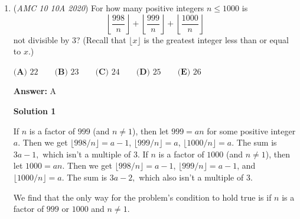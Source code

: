 \begin{enumerate}
 Therefore, the product contains exactly $8\cdot17=136$ distinct powers of $2$.

 Finally, the extra $1=2^0$ contributes one more distinct power of $2$.

 Thus, the answer is

 
 \[\boxed{8\cdot17+1=137}.\]




\textbf{Solution 9 (Intermediate Value Theorem, Cheese)}

Notice that A, C, and D are all odd integers while B and E are not. Notice that $117<137<273$. Thus, according to the intermediate value theorem of guessing, the answer is $\boxed{\textbf{(C) }137}$

 Important Note: IVT does not apply to answers which are consecutive integers because parity distinction is irrelevant (special case).

 Note following Important Note: There are a lot more cases.

 \href{https://artofproblemsolving.com/videos/amc/2020amc10a/511}{https://artofproblemsolving.com/videos/amc/2020amc10a/511}

 


	\item (\textit{AMC 10 10A 2020}) For how many positive integers $n \le 1000$ is
 \[\left\lfloor \dfrac{998}{n} \right\rfloor+\left\lfloor \dfrac{999}{n} \right\rfloor+\left\lfloor \dfrac{1000}{n}\right \rfloor\]not divisible by $3$? (Recall that $\lfloor x \rfloor$ is the greatest integer less than or equal to $x$.)


 $\textbf{(A) } 22 \qquad\textbf{(B) } 23 \qquad\textbf{(C) } 24 \qquad\textbf{(D) } 25 \qquad\textbf{(E) } 26$

 \textbf{Answer: }A



\textbf{Solution 1}

If $n$ is a factor of $999$ (and $n \neq 1$), then let $999 = an$ for some positive integer $a.$ Then we get $\lfloor 998/n \rfloor = a - 1$, $\lfloor 999/n \rfloor =a$, $\lfloor 1000/n \rfloor = a$. The sum is $3a - 1,$ which isn't a multiple of 3. If $n$ is a factor of $1000$ (and $n \neq 1$), then let $1000 = an.$ Then we get $\lfloor 998/n \rfloor = a - 1$, $\lfloor 999/n \rfloor = a - 1$, and $\lfloor 1000/n \rfloor = a.$ The sum is $3a - 2,$ which also isn't a multiple of 3. 

 We find that the only way for the problem's condition to hold true is if $n$ is a factor of $999$ or $1000$ and $n \neq 1$.


\end{enumerate}
